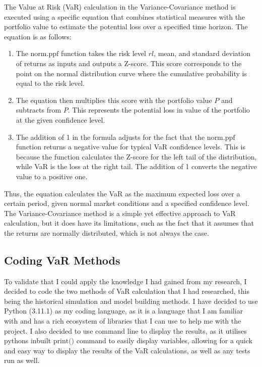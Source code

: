 \documentclass{article}
\begin{document}
\newpage
The Value at Risk (VaR) calculation in the Variance-Covariance method is executed using a specific equation that combines statistical measures with the portfolio value to estimate the potential loss over a specified time horizon. The equation is as follows:

\begin{enumerate}
    \item The \(\text{norm.ppf}\) function takes the risk level \( rl \), mean, and standard deviation of returns as inputs and outputs a Z-score. This score corresponds to the point on the normal distribution curve where the cumulative probability is equal to the risk level.
    \item The equation then multiplies this score with the portfolio value \( P \) and subtracts from \( P \). This represents the potential loss in value of the portfolio at the given confidence level.
    \item The addition of 1 in the formula adjusts for the fact that the \(\text{norm.ppf}\) function returns a negative value for typical VaR confidence levels. This is because the function calculates the Z-score for the left tail of the distribution, while VaR is the loss at the right tail. The addition of 1 converts the negative value to a positive one.
\end{enumerate}

Thus, the equation calculates the VaR as the maximum expected loss over a certain period, given normal market conditions and a specified confidence level. The Variance-Covariance method is a simple yet effective approach to VaR calculation, but it does have its limitations, such as the fact that it assumes that the returns are normally distributed, which is not always the case.\\\vspace{0.3cm}




\subsection{Coding VaR Methods}
To validate that I could apply the knowledge I had gained from my research, I decided to code the two methods of VaR calculation that I had researched, this being the historical simulation and model building methods. I have decided to use Python (3.11.1) as my coding language, as it is a language that I am familiar with and has a rich ecosystem of libraries that I can use to help me with the project. I also decided to use command line to display the results, as it utilises pythons inbuilt \(\text{print()}\) command to easily display variables, allowing for a quick and easy way to display the results of the VaR calculations, as well as any tests run as well. %
\end{document}
